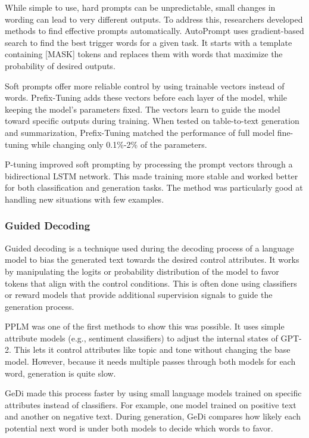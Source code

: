 While simple to use, hard prompts can be unpredictable, small changes in wording can lead to very different outputs. To address this, researchers developed methods to find effective prompts automatically. AutoPrompt \cite{shin-etal-2020-autoprompt} uses gradient-based search to find the best trigger words for a given task. It starts with a template containing [MASK] tokens and replaces them with words that maximize the probability of desired outputs.

Soft prompts offer more reliable control by using trainable vectors instead of words. Prefix-Tuning \cite{li-liang-2021-prefix} adds these vectors before each layer of the model, while keeping the model's parameters fixed. The vectors learn to guide the model toward specific outputs during training. When tested on table-to-text generation and summarization, Prefix-Tuning matched the performance of full model fine-tuning while changing only 0.1\%-2\% of the parameters.

P-tuning \cite{liu-etal-2022-p} improved soft prompting by processing the prompt vectors through a bidirectional LSTM network. This made training more stable and worked better for both classification and generation tasks. The method was particularly good at handling new situations with few examples.

\subsubsection{Guided Decoding}

Guided decoding is a technique used during the decoding process of a language model to bias the generated text towards the desired control attributes. 
It works by manipulating the logits or probability distribution of the model to favor tokens that align with the control conditions.
This is often done using classifiers or reward models that provide additional supervision signals to guide the generation process.

PPLM \cite{dathathri2020plugplaylanguagemodels} was one of the first methods to show this was possible. It uses simple attribute models (e.g., sentiment classifiers) to adjust the internal states of GPT-2. This lets it control attributes like topic and tone without changing the base model. However, because it needs multiple passes through both models for each word, generation is quite slow.

GeDi \cite{krause-etal-2021-gedi-generative} made this process faster by using small language models trained on specific attributes instead of classifiers. For example, one model trained on positive text and another on negative text. During generation, GeDi compares how likely each potential next word is under both models to decide which words to favor.

